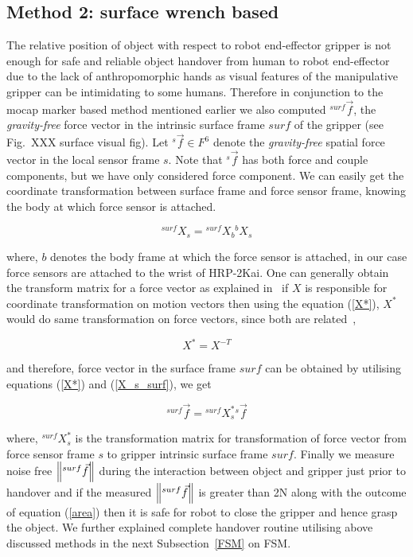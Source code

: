 \documentclass[a4paper, 12pt, oneside]{Thesis}  %
\begin{document}
\subsection{Method 2: surface wrench based}\label{surface wrench}
The relative position of object with respect to robot end-effector gripper is not enough for safe and reliable object handover from human to robot end-effector due to the lack of anthropomorphic hands as visual features of the manipulative gripper can be intimidating to some humans. Therefore in conjunction to the mocap marker based method mentioned earlier we also computed ${}^{surf}\vec{f}$, the \textit{gravity-free} force vector in the intrinsic surface frame $surf$ of the gripper (see Fig.~XXX  surface visual fig). Let ${}^s\vec{f}\in F^6$ denote the \textit{gravity-free} spatial force vector in the local sensor frame $s$. Note that ${}^s\vec{f}$ has both force and couple components, but we have only considered force component. We can easily get the coordinate transformation between surface frame and force sensor frame, knowing the body at which force sensor is attached.

\begin{equation}\label{X_s_surf}
    {}^{surf}X_{s} = {}^{surf}X_{b} {}^{b}X_s
\end{equation}

where, $b$ denotes the body frame at which the force sensor is attached, in our case force sensors are attached to the wrist of HRP-2Kai. One can generally obtain the transform matrix for a force vector as explained in~\cite{featherstone2014rigid} if $X$ is responsible for coordinate transformation on motion vectors then using the equation (\ref{X*}), $X^{*}$ would do same transformation on force vectors, since both are related~\cite{featherstone2014rigid},

\begin{equation}\label{X*}
    X^{*} = X^{-T}
\end{equation}

and therefore, force vector in the surface frame $surf$ can be obtained by utilising equations (\ref{X*}) and (\ref{X_s_surf}), we get

\begin{equation}\label{force surf}
    {}^{surf}\vec{f} = {}^{surf}X_{s}^{*} {}^s\vec{f}
\end{equation}

where, ${}^{surf}X_{s}^{*}$ is the transformation matrix for transformation of force vector from force sensor frame $s$ to gripper intrinsic surface frame $surf$. Finally we measure noise free $\norm{{}^{surf}\vec{f}}$ during the interaction between object and gripper just prior to handover and if the measured $\norm{{}^{surf}\vec{f}}$ is greater than 2N along with the outcome of equation (\ref{area}) then it is safe for robot to close the gripper and hence grasp the object. We further explained complete handover routine utilising above discussed methods in the next Subsection~\ref{FSM} on FSM.
\end{document}

